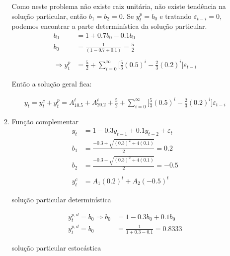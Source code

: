 \begin{enumerate}
\begin{enumerate}
	Como neste problema não existe raiz unitária, não existe tendência na solução particular, então $b_1=b_2=0$. Se $y_t^p=b_0$ e tratando $\varepsilon_{t-i}=0$, podemos encontrar a parte determinística da solução particular.
	\begin{align*}
		b_0&=1+0.7b_0-0.1b_0\\
		b_0&=\frac{1}{(1-0.7+0.1)}=\frac{5}{2}\\
		\\
		\Rightarrow y_t^p&=\frac{5}{2}+\sum\limits_{i=0}^{\infty}\Bigg[\frac{5}{3}(0.5)^i-\frac{2}{3}(0.2)^i\Bigg]\varepsilon_{t-i}
	\end{align*}
	
	Então a solução geral fica:
	
	\begin{align*}
	y_t=y_t^c+y_t^p=A_10.5^t+A_20.2^t+\frac{5}{2}+\sum\limits_{i=0}^{\infty}\Bigg[\frac{5}{3}(0.5)^i-\frac{2}{3}(0.2)^i\Bigg]\varepsilon_{t-i}
	\end{align*}

	
		
		
	\item %
	Função complementar	
	\begin{align*}
			y_t &= 1 -0.3y_{t-1} + 0.1y_{t-2} + \varepsilon_t\\
			b_1&=\frac{-0.3+\sqrt{(0.3)^2+4(0.1)}}{2}=0.2\\
			b_2&=\frac{-0.3-\sqrt{(0.3)^2+4(0.1)}}{2}=-0.5\\
			\\
			y_t^c&=A_1(0.2)^t+A_2(-0.5)^t
	\end{align*}
	
	solução particular determinística
	
	\begin{align*}
	 y_t^{p,d}=b_0 \Rightarrow b_0&=1-0.3b_0+0.1b_0\\
	 y_t^{p,d}=b_0&=\frac{1}{1+0.3-0.1}=0.8333
	\end{align*}
	
	solução particular estocástica
	

\end{enumerate}
\end{enumerate}
